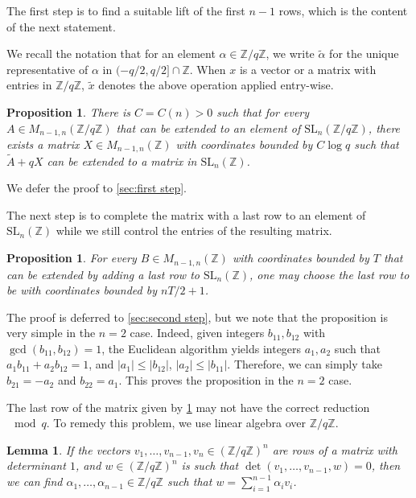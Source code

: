 \documentclass[12pt, a4paper]{amsart}
\numberwithin{equation}{section}
\newtheorem{lemma}[theorem]{Lemma}
\newtheorem{prop}[theorem]{Proposition}
\theoremstyle{definition}
\newcommand{\Z}{\mathbb{Z}}
\newcommand{\SL}{\mathrm{SL}}
\newcommand{\wt}{\widetilde}
\begin{document}
The first step is to find a suitable lift of the first $n-1$ rows, which
is the content of the next statement.

We recall the notation that for an element $\alpha\in\Z/q\Z$, we write
$\wt \alpha$ for the unique representative of $\alpha$ in $(-q/2,q/2]\cap\Z$.
When $x$ is a vector or a matrix with entries in $\Z/q\Z$, $\wt x$ denotes
the above operation applied entry-wise. 

\begin{prop}\label{prop:step 1}
There is $C=C(n)>0$ such that for every $A\in M_{n-1,n}(\Z/q\Z)$ that can
be extended to an element of $\SL_n(\Z/q\Z)$, 
there exists a matrix $X\in M_{n-1,n}(\Z)$ with coordinates bounded by $C\log q$ such that $\wt A+qX$ can be extended to a matrix in $\SL_{n}(\Z)$. 
\end{prop}

We defer the proof to \cref{sec:first step}.

The next step is to complete the matrix with a last row to an element
of $\SL_n(\Z)$ while we still control the entries of the resulting matrix.

\begin{prop}\label{prop:step 2}
For every $B\in M_{n-1,n}(\Z)$ with coordinates bounded by $T$ that can be extended by adding a last row to $\SL_n(\Z)$, 
one may choose the last row to be with coordinates bounded by $nT/2+1$.
\end{prop}

The proof is deferred to \cref{sec:second step}, but we note that
the proposition is very simple in the $n=2$ case.
Indeed, given integers $b_{11},b_{12}$ with $\gcd(b_{11},b_{12})=1$, the Euclidean algorithm
yields integers $a_1,a_2$ such that $a_1b_{11}+a_2b_{12}=1$, and $|a_1| \le |b_{12}|$, $|a_2| \le |b_{11}|$. Therefore, we can
simply take $b_{21}=-a_2$ and $b_{22}=a_1$.
This proves the proposition in the $n=2$ case.

The last row of the matrix given by \cref{prop:step 2} may not
have the correct reduction $\mod q$.
To remedy this problem, we use linear algebra over $\Z/q\Z$.

\begin{lemma}\label{lem:linear algebra}
If the vectors $v_{1},\ldots,v_{n-1}, v_n\in (\Z/q\Z)^n$ are rows of a matrix
with determinant $1$, and $w\in(\Z/q\Z)^n$ is such that $\det(v_1,\ldots,v_{n-1},w)=0$,
then we can find $\alpha_{1},\ldots,\alpha_{n-1}\in \Z/q\Z$ such that $w=\sum_{i=1}^{n-1}\alpha_{i}v_{i}$.
\end{lemma}
\end{document}
